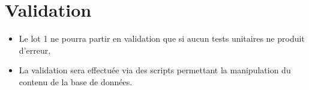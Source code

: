 \section{Validation}	
	\begin{itemize}
		\item Le lot 1 ne pourra partir en validation que si aucun tests unitaires ne produit d'erreur,
		\item La validation sera effectuée via des scripts permettant la manipulation du contenu de la base de données.
	\end{itemize}
	
